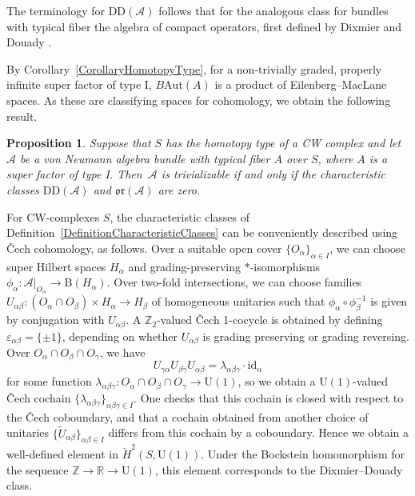 \documentclass[10pt,a4paper]{amsart}
\numberwithin{equation}{section}
\newtheorem{Proposition}[Theorem]{Proposition}
\newcommand{\R}{\mathbb{R}}
\newcommand{\Z}{\mathbb{Z}}
\newcommand{\B}{\mathrm{B}}
\newcommand{\A}{\mathcal{A}}
\newcommand{\Aut}{\mathrm{Aut}}
\newcommand{\U}{\mathrm{U}}
\newcommand{\DD}{\mathrm{DD}}
\newcommand{\oclass}{\mathfrak{or}}
\begin{document}
The terminology for $\DD(\A)$ follows that for the analogous class for bundles with typical fiber the algebra of compact operators, first defined by Dixmier and Douady \cite{DixmierDouady}.

By Corollary~\ref{CorollaryHomotopyType}, for a non-trivially graded, properly infinite super factor of type I, $B\Aut(A)$ is a product of Eilenberg--MacLane spaces.
As these are classifying spaces for cohomology, we obtain the following result.

\begin{Proposition}
Suppose that $S$ has the homotopy type of a CW complex and let $\A$ be a von Neumann algebra bundle with typical fiber $A$ over $S$, where $A$ is a super factor of type I.
Then~$\A$ is trivializable if and only if the characteristic classes $\DD(\A)$ and $\oclass(\A)$ are zero.
\end{Proposition}

\begin{Remark} \label{RemarkCheckPicture}
For CW-complexes $S$, the characteristic classes of Definition~\ref{DefinitionCharacteristicClasses} can be conveniently described using \v{C}ech cohomology, as follows.
Over a suitable open cover $\{O_\alpha\}_{\alpha \in I}$, we can choose super Hilbert spaces $H_\alpha$ and grading-preserving $*$-isomorphisms $\phi_\alpha\colon \mathcal{A}|_{O_\alpha} \to \B(H_\alpha)$.
Over two-fold intersections, we can choose families $U_{\alpha\beta}\colon (O_\alpha \cap O_\beta) \times H_\alpha \to H_\beta$ of homogeneous unitaries such that $\phi_\alpha \circ \phi_\beta^{-1}$ is given by conjugation with $U_{\alpha\beta}$.
A $\Z_2$-valued \v{C}ech 1-cocycle is obtained by defining $\varepsilon_{\alpha\beta} = \{\pm 1\}$, depending on whether $U_{\alpha\beta}$ is grading preserving or grading reversing.
Over $O_\alpha \cap O_\beta \cap O_\gamma$, we have
\begin{equation*}
U_{\gamma \alpha} U_{\beta\gamma} U_{\alpha\beta} = \lambda_{\alpha\beta\gamma} \cdot \mathrm{id}_\alpha
\end{equation*}
for some function $\lambda_{\alpha\beta\gamma} \colon O_\alpha \cap O_\beta \cap O_\gamma \to \U(1)$, so we obtain a $\U(1)$-valued \v{C}ech cochain $\{\lambda_{\alpha\beta\gamma}\}_{\alpha\beta\gamma\in I}$.
One checks that this cochain is closed with respect to the \v{C}ech coboundary, and that a cochain obtained from another choice of unitaries $\{\tilde{U}_{\alpha\beta}\}_{\alpha \beta \in I}$ differs from this cochain by a coboundary.
Hence we obtain a well-defined element in $\check{H}^2(S, \U(1))$.
Under the Bockstein homomorphism for the sequence $\Z \to \R \to \U(1)$, this element corresponds to the Dixmier--Douady class.
\end{Remark}
\end{document}
